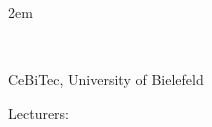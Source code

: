 \begin{titlepage}
\selectfont
\leftskip2em

\begin{minipage}[t]{0.4\textwidth}
\large \thesisType\\
\normalsize \thesisCourse
\end{minipage}
\hfill
\begin{minipage}[t]{0.4\textwidth}
\begin{flushright}
CeBiTec, University of Bielefeld\\
\end{flushright}
\end{minipage}

\vfill

{\selectfont 
\Huge \thesisTitle
\begin{flushright}
\Large \thesisAuthor
\end{flushright}
}

\vfill

\normalsize
\begin{minipage}[t]{5em}
\end{minipage}
\begin{minipage}[t]{0.5\textwidth}
\end{minipage}

\begin{minipage}[t]{5em}
Lecturers:\quad
\end{minipage}
\begin{minipage}[t]{0.5\textwidth}
\thesisSupervisor
\end{minipage}




\vfill

\thesisDate
\hfill

\enlargethispage{2\baselineskip}

\end{titlepage}